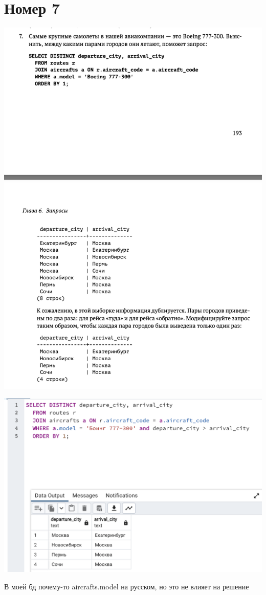 \documentclass[a4paper,12pt]{article}
\begin{document}
\section*{Номер 7}
\includegraphics[scale=0.6]{t7.png}
\begin{center}
\includegraphics[scale=0.5]{71.png}
\end{center}
В моей бд почему-то aircrafts.model на русском, но это не влияет на решение
\clearpage
\end{document}
